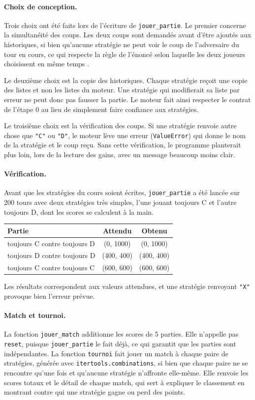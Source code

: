 \documentclass[11pt,a4paper]{article}
\begin{document}
\paragraph{Choix de conception.} Trois choix ont été faits lors de l'écriture de \texttt{jouer\_partie}. Le premier concerne la
simultanéité des coups. Les deux coups sont demandés avant d'être ajoutés aux historiques, si bien qu'aucune stratégie ne peut
voir le coup de l'adversaire du tour en cours, ce qui respecte la règle de l'énoncé selon laquelle les deux joueurs
choisissent \og en même temps \fg{}.

Le deuxième choix est la copie des historiques. Chaque stratégie reçoit une copie des listes et non les listes du moteur. Une
stratégie qui modifierait sa liste par erreur ne peut donc pas fausser la partie. Le moteur fait ainsi respecter le contrat de
l'étape 0 au lieu de simplement faire confiance aux stratégies.

Le troisième choix est la vérification des coups. Si une stratégie renvoie autre chose que \texttt{"C"} ou \texttt{"D"}, le
moteur lève une erreur (\texttt{ValueError}) qui donne le nom de la stratégie et le coup reçu. Sans cette vérification, le
programme planterait plus loin, lors de la lecture des gains, avec un message beaucoup moins clair.

\paragraph{Vérification.} Avant que les stratégies du cours soient écrites, \texttt{jouer\_partie} a été lancée sur 200 tours
avec deux stratégies très simples, l'une jouant toujours C et l'autre toujours D, dont les scores se calculent à la main.
\begin{center}
\begin{tabular}{lcc}
\toprule
Partie & Attendu & Obtenu \\
\midrule
toujours C contre toujours D & (0, 1000) & (0, 1000) \\
toujours D contre toujours D & (400, 400) & (400, 400) \\
toujours C contre toujours C & (600, 600) & (600, 600) \\
\bottomrule
\end{tabular}
\end{center}
Les résultats correspondent aux valeurs attendues, et une stratégie renvoyant \texttt{"X"} provoque bien l'erreur prévue.

\paragraph{Match et tournoi.} La fonction \texttt{jouer\_match} additionne les scores de 5 parties. Elle n'appelle pas
\texttt{reset}, puisque \texttt{jouer\_partie} le fait déjà, ce qui garantit que les parties sont indépendantes. La fonction
\texttt{tournoi} fait jouer un match à chaque paire de stratégies, générée avec \texttt{itertools.combinations}, si bien que
chaque paire ne se rencontre qu'une fois et qu'aucune stratégie n'affronte elle-même. Elle renvoie les scores totaux et le
détail de chaque match, qui sert à expliquer le classement en montrant contre qui une stratégie gagne ou perd des points.
\end{document}
